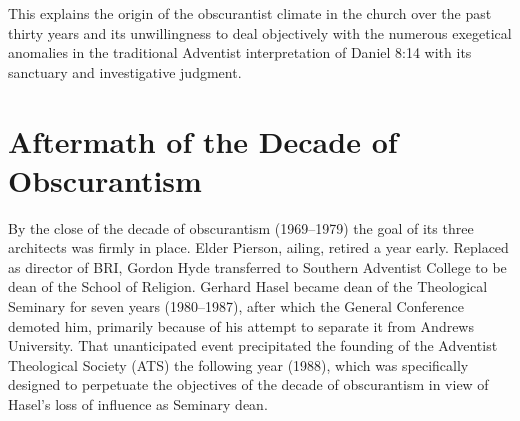 This explains the origin of the obscurantist climate in the church over the
past thirty years and its unwillingness to deal objectively with the
numerous exegetical anomalies in the traditional Adventist interpretation of
Daniel 8:14 with its sanctuary and investigative judgment.

\section{Aftermath of the Decade of Obscurantism}

By the close of the decade of obscurantism (1969--1979) the goal of its three
architects was firmly in place. Elder Pierson, ailing, retired a year early.
Replaced as director of BRI, Gordon Hyde transferred to Southern Adventist
College to be dean of the School of Religion. Gerhard Hasel became dean of
the Theological Seminary for seven years (1980--1987), after which the
General Conference demoted him, primarily because of his attempt to separate
it from Andrews University.
That unanticipated event precipitated the
founding of the Adventist Theological Society (ATS) the following year
(1988), which was specifically designed to perpetuate the objectives of the
decade of obscurantism in view of Hasel's loss of influence as Seminary
dean.


